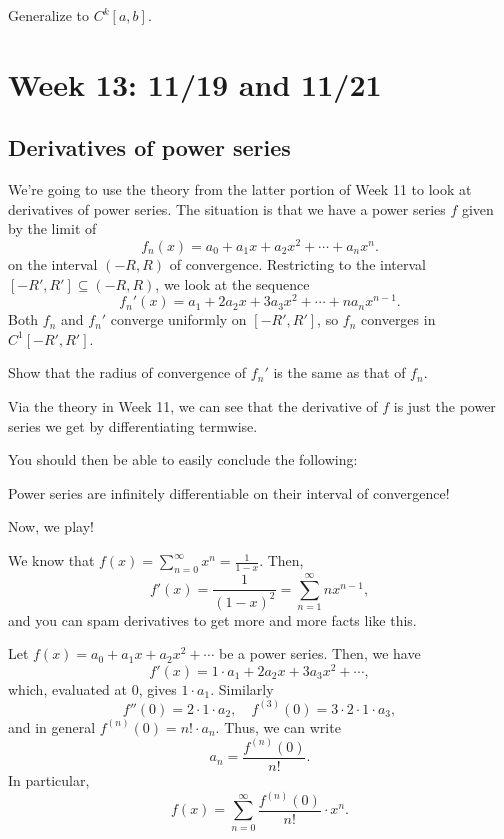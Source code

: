 \documentclass[10pt]{scrartcl}
\begin{document}
\begin{exercise}
	Generalize to $C^k[a,b]$.
\end{exercise}

\pagebreak
\setcounter{section}{12}
\section{Week 13: 11/19 and 11/21}

\subsection{Derivatives of power series}
We're going to use the theory from the latter portion of Week 11
to look at derivatives of power series.
The situation is that we have a power series $f$ given by the limit of
\[f_n(x) = a_0 + a_1x + a_2x^2 + \cdots + a_nx^n.\]
on the interval $(-R, R)$ of convergence.
Restricting to the interval $[-R', R']\subseteq(-R, R)$, we look at the sequence
\[f_n'(x) = a_1 + 2a_2x + 3a_3x^2 + \cdots + na_nx^{n-1}.\]
Both $f_n$ and $f_n'$ converge uniformly on $[-R', R']$, so $f_n$
converges in $C^1[-R', R']$.

\begin{exercise}
	Show that the radius of convergence of $f_n'$ is the same as that of $f_n$.
\end{exercise}

Via the theory in Week 11, we can see that the derivative of $f$ is just
the power series we get by differentiating termwise.

You should then be able to easily conclude the following:
\begin{theorem}
	Power series are infinitely differentiable
	on their interval of convergence!
\end{theorem}

Now, we play!
\begin{example}
	We know that $f(x) = \sum_{n=0}^\infty x^n = \frac{1}{1-x}$. Then,
	\[f'(x) = \frac{1}{(1-x)^2} =
	\sum_{n=1}^\infty nx^{n-1},\]
	and you can spam derivatives to get more and more facts like this.
\end{example}

\begin{example}
	Let $f(x) = a_0 + a_1x + a_2x^2 + \cdots$ be a power series.
	Then, we have
	\[f'(x) = 1\cdot a_1 + 2a_2x + 3a_3x^2 + \cdots,\]
	which, evaluated at $0$, gives $1\cdot a_1$.
	Similarly
	\[f''(0) = 2\cdot 1\cdot a_2,\quad f^{(3)}(0) = 3\cdot2\cdot1\cdot a_3,\]
	and in general $f^{(n)}(0) = n!\cdot a_n$.
	Thus, we can write
	\[a_n = \frac{f^{(n)}(0)}{n!}.\]
	In particular,
	\[f(x) = \sum_{n=0}^{\infty} \frac{f^{(n)}(0)}{n!}\cdot x^n.\]
\end{example}
\end{document}
